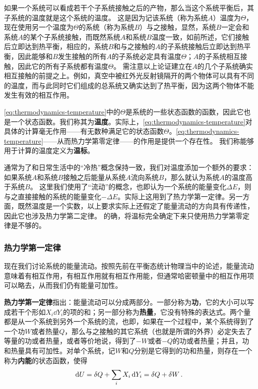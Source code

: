 \documentclass[hyperref, UTF8, a4paper]{ctexart}
\begin{document}
如果一个系统可以看成若干个子系统接触之后的产物，那么当这个系统平衡后，其子系统的温度就是这个系统的温度。
这是因为记该系统（称为系统$A$）温度为$\Theta$，现在使用另一个温度为$\Theta$的系统（称为系统$B$）与之接触，显然，系统$B$一定会和系统$A$的某个子系统接触，而既然系统$A$和系统$B$温度一致，如前所述，它们接触后立即达到热平衡，相应的，系统$B$和与之接触的$A$的子系统接触后立即达到热平衡，因此能够和$B$发生接触的所有$A$的子系统必定具有温度$\Theta$；$A$的子系统相互接触，因此它的所有子系统都有温度$\Theta$。
需注意以上论证建立在$A$的几个子系统确实相互接触的前提之上。例如，真空中被红外光反射镜隔开的两个物体可以具有不同的温度，而与此同时它们组成的总系统又确实达到了热平衡，因为这两个物体不能发生有效的相互作用。

\eqref{eq:thermodynamics-temperature}中的$\Theta$是系统的一些状态函数的函数，因此它也是一个状态函数。我们称其为\textbf{温度}。实际上，\eqref{eq:thermodynamics-temperature}对具体的计算毫无作用——有无数种满足它的状态函数$\Theta$。\eqref{eq:thermodynamics-temperature}——从而热力学第零定律——的作用是提供一个存在性。
我们称能够用于计算的温度定义为\textbf{温标}。

通常为了和日常生活中的“冷热”概念保持一致，我们对温度添加一个额外的要求：如果系统$A$和系统$B$接触之后能量从系统$A$流向系统$B$，那么就认为系统$A$的温度高于系统$B$。
这里我们使用了“流动”的概念，也即认为一个系统的能量变化$\Delta E$，则与之直接接触的系统的能量变化$-\Delta E$。实际上这用到了热力学第一定律。另一方面，既然温度是一个实数，以上要求实际上还假定了能量流动的方向具有传递性，因此它也涉及热力学第二定律。
的确，将温标完全确定下来只使用热力学第零定律是不够的。

\subsubsection{热力学第一定律}

现在我们讨论系统的能量流动。按照先前在平衡态统计物理当中的论述，能量流动意味着有相互作用，有相互作用就有相互作用能，但通常哈密顿量中的相互作用项可以略去，从而我们仍有能量可加性。

\textbf{热力学第一定律}指出：能量流动可以分成两部分。一部分称为\textbf{功}，它的大小可以写成若干个形如$X_i \dd{Y_i}$的项的和；另一部分称为\textbf{热量}，它没有特殊的表达式。两个量都是从一个系统到另外一个系统的流，也即，如果在一个过程中，某个系统得到了一个功$W$或者热量$Q$，那么与之接触的其它系统（也就是所谓的外界）必定失去了等量的功或者热量，或者等价地说，得到了$-W$或者$-Q$的功或者热量；并且，功和热量具有可加性。对单个系统，记$W$和$Q$分别是它得到的功和热量，则存在一个称为\textbf{内能}的状态函数，使得
\begin{equation}
    \dd{U} = \delta{Q} + \sum_i X_i \dd{Y_i} = \var{Q} + \var{W}.
    \label{eq:thermodynamics-first-law}
\end{equation}
\end{document}
